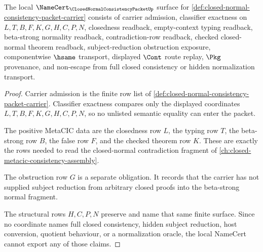 \begin{theorem}
\label{thm:closed-normal-consistency-packet-namecert-obligations}
The local $\NameCert_{\ClosedNormalConsistencyPacketUp}$ surface for \autoref{def:closed-normal-consistency-packet-carrier} consists of carrier admission, classifier exactness on $L,T,B,F,K,G,H,C,P,N$, closedness readback, empty-context typing readback, beta-strong normality readback, contradiction-row readback, checked closed-normal theorem readback, subject-reduction obstruction exposure, componentwise $\hsame$ transport, displayed $\Cont$ route replay, $\Pkg$ provenance, and non-escape from full closed consistency or hidden normalization transport.
\end{theorem}
\begin{proof}
Carrier admission is the finite row list of \autoref{def:closed-normal-consistency-packet-carrier}. Classifier exactness compares only the displayed coordinates $L,T,B,F,K,G,H,C,P,N$, so no unlisted semantic equality can enter the packet.

The positive MetaCIC data are the closedness row $L$, the typing row $T$, the beta-strong row $B$, the false row $F$, and the checked theorem row $K$. These are exactly the rows needed to read the closed-normal contradiction fragment of \autoref{ch:closed-metacic-consistency-assembly}.

The obstruction row $G$ is a separate obligation. It records that the carrier has not supplied subject reduction from arbitrary closed proofs into the beta-strong normal fragment.

The structural rows $H,C,P,N$ preserve and name that same finite surface. Since no coordinate names full closed consistency, hidden subject reduction, host conversion, quotient behaviour, or a normalization oracle, the local NameCert cannot export any of those claims.
\end{proof}

